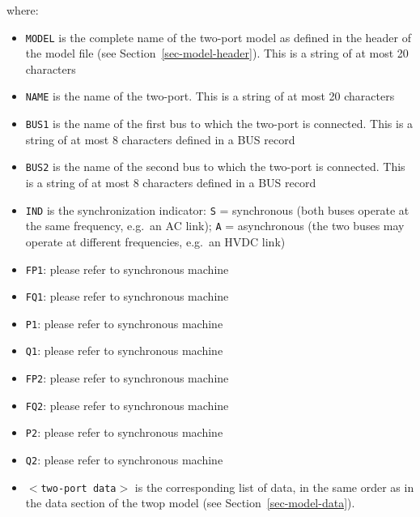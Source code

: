 where:
\begin{itemize}
\item{\tt MODEL} is the complete name of the two-port model as defined in the header of the model file (see Section~\ref{sec-model-header}). This is a string of at most 20 characters
\item{\tt NAME} is the name of the two-port.  This is a string of at most 20 characters
\item{\tt BUS1} is the name of the first bus to which the two-port is connected. This is a string of at most 8 characters defined in a BUS record
\item{\tt BUS2} is the name of the second bus to which the two-port is connected. This is a string of at most 8 characters defined in a BUS record
\item{\tt IND} is the synchronization indicator: {\tt S} = synchronous (both buses operate at the same frequency, e.g.\ an AC link); {\tt A} = asynchronous (the two buses may operate at different frequencies, e.g.\ an HVDC link)
\item{\tt FP1}: please refer to synchronous machine
\item{\tt FQ1}: please refer to synchronous machine
\item{\tt P1}: please refer to synchronous machine
\item{\tt Q1}: please refer to synchronous machine
\item{\tt FP2}: please refer to synchronous machine
\item{\tt FQ2}: please refer to synchronous machine
\item{\tt P2}: please refer to synchronous machine
\item{\tt Q2}: please refer to synchronous machine
\item{\tt $<$two-port data$>$} is the corresponding list of data, in the same order as in the data section of the twop model (see Section~\ref{sec-model-data}).
\end{itemize}